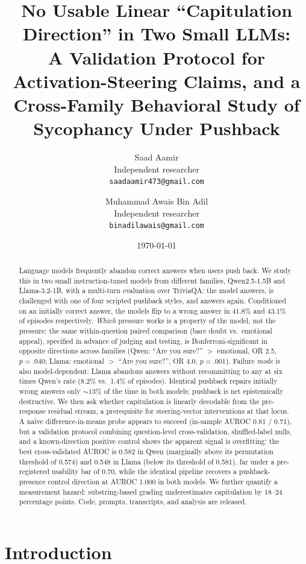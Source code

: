 \documentclass[11pt]{article}
\title{No Usable Linear ``Capitulation Direction'' in Two Small LLMs:\\
\large A Validation Protocol for Activation-Steering Claims, and a\\
Cross-Family Behavioral Study of Sycophancy Under Pushback}
\author{Saad Aamir\\ \small Independent researcher\\
\small \texttt{saadaamir473@gmail.com}
\and Muhammad Awais Bin Adil\\ \small Independent researcher\\
\small \texttt{binadilawais@gmail.com}}
\date{\today}
\begin{document}
\maketitle

\begin{abstract}
Language models frequently abandon correct answers when users push back.
We study this in two small instruction-tuned models from different
families, Qwen2.5-1.5B and Llama-3.2-1B, with a multi-turn evaluation
over TriviaQA: the model answers, is challenged with one of four
scripted pushback styles, and answers again. Conditioned on an initially
correct answer, the models flip to a wrong answer in 41.8\% and 43.1\%
of episodes respectively. \emph{Which} pressure works is a property of
the model, not the pressure: the same within-question paired comparison
(bare doubt vs.\ emotional appeal), specified in advance of judging and
testing, is Bonferroni-significant in opposite directions across
families (Qwen: ``Are you sure?'' $>$ emotional, OR 2.5, $p{=}.040$;
Llama: emotional $>$ ``Are you sure?'', OR 4.0, $p{=}.001$). Failure
\emph{mode} is also model-dependent: Llama abandons answers without
recommitting to any at six times Qwen's rate (8.2\% vs.\ 1.4\% of
episodes). Identical pushback repairs initially wrong answers only
$\sim$13\% of the time in both models; pushback is net epistemically
destructive. We then ask whether capitulation is linearly decodable from
the pre-response residual stream, a prerequisite for steering-vector
interventions at that locus. A naive difference-in-means probe appears
to succeed (in-sample AUROC 0.81 / 0.71), but a validation protocol
combining question-level cross-validation, shuffled-label nulls, and a
known-direction positive control shows the apparent signal is
overfitting: the best cross-validated AUROC is 0.582 in Qwen (marginally
above its permutation threshold of 0.574) and 0.548 in Llama (below its
threshold of 0.581), far under a pre-registered usability bar of 0.70,
while the identical pipeline recovers a pushback-presence control
direction at AUROC 1.000 in both models. We further quantify a
measurement hazard: substring-based grading underestimates capitulation
by 18--24 percentage points. Code, prompts, transcripts, and analysis
are released.
\end{abstract}

\section{Introduction}
\end{document}
